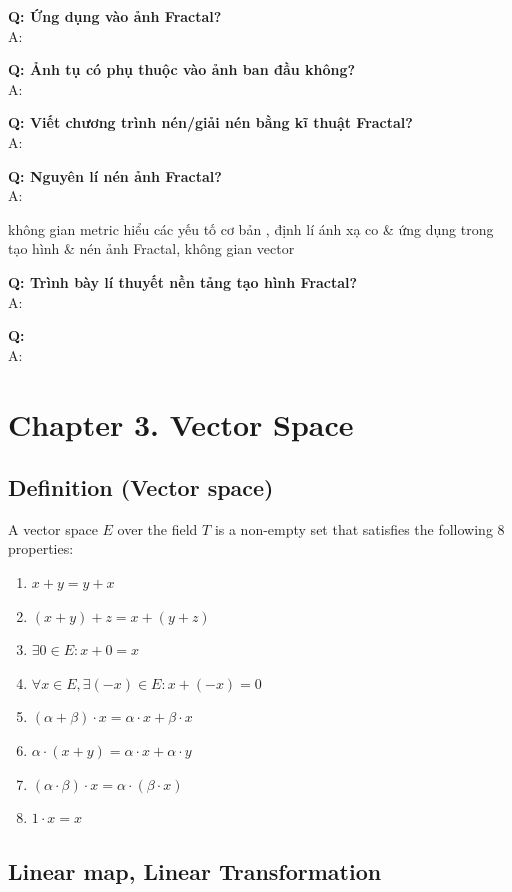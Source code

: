 \textbf{Q: Ứng dụng vào ảnh Fractal?}\\
A: 

\textbf{Q: Ảnh tụ có phụ thuộc vào ảnh ban đầu không?}\\
A:

\textbf{Q: Viết chương trình nén/giải nén bằng kĩ thuật Fractal?}\\
A: 

\textbf{Q: Nguyên lí nén ảnh Fractal?}\\
A: 


không gian metric hiểu các yếu tố cơ bản
, định lí ánh xạ co \& ứng dụng trong tạo hình \& nén ảnh Fractal, 
không gian vector

\textbf{Q: Trình bày lí thuyết nền tảng tạo hình Fractal?}\\
A: 


\textbf{Q: }\\
A: 

\section{Chapter 3. Vector Space}
\subsection{Definition (Vector space)}

A vector space $E$ over the field $T$ is a non-empty set that satisfies the following 8 properties:

\begin{enumerate}
    \item $x + y = y + x$
    \item $(x + y) + z = x + (y + z)$
    \item $\exists 0 \in E: x + 0 = x$
    \item $\forall x \in E, \exists (-x) \in E: x + (-x) = 0$
    \item $(\alpha + \beta) \cdot x = \alpha \cdot x + \beta \cdot x$
    \item $\alpha \cdot (x + y) = \alpha \cdot x + \alpha \cdot y$
    \item $(\alpha \cdot \beta) \cdot x = \alpha \cdot (\beta \cdot x)$
    \item $1 \cdot x = x$
\end{enumerate}

\subsection{Linear map, Linear Transformation}

